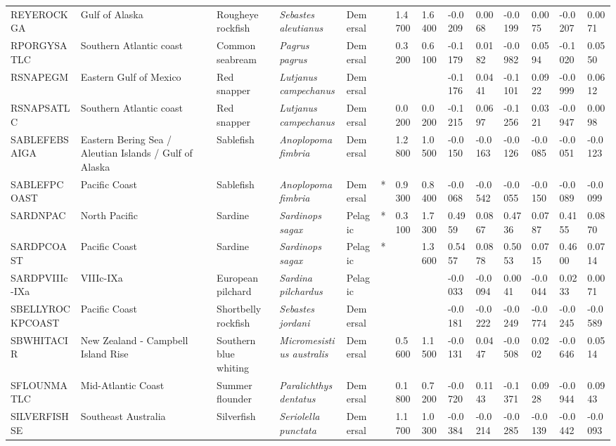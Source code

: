 \begin{longtable}{p{2.6cm}p{1.9cm}p{1.7cm}p{1.6cm}p{1cm}p{0.3cm}p{1cm}p{1cm}p{1cm}p{1.1cm}p{1cm}p{1.1cm}p{1cm}p{1.1cm}}
  REYEROCKGA & Gulf of Alaska & Rougheye rockfish & \textit{Sebastes aleutianus} & Demersal &   & 1.4700 & 1.6400 & -0.0209 & 0.0068 & -0.0199 & 0.0075 & -0.0207 & 0.0071 \\ 
  RPORGYSATLC & Southern Atlantic coast & Common seabream & \textit{Pagrus pagrus} & Demersal &   & 0.3200 & 0.6100 & -0.1179 & 0.0182 & -0.0982 & 0.0594 & -0.1020 & 0.0550 \\ 
  RSNAPEGM & Eastern Gulf of Mexico & Red snapper & \textit{Lutjanus campechanus} & Demersal &  &  &  & -0.1176 & 0.0441 & -0.1101 & 0.0922 & -0.0999 & 0.0612 \\ 
  RSNAPSATLC & Southern Atlantic coast & Red snapper & \textit{Lutjanus campechanus} & Demersal &   & 0.0200 & 0.0200 & -0.1215 & 0.0697 & -0.1256 & 0.0321 & -0.0947 & 0.0098 \\ 
  SABLEFEBSAIGA & Eastern Bering Sea / Aleutian Islands / Gulf of Alaska & Sablefish & \textit{Anoplopoma fimbria} & Demersal &   & 1.2800 & 1.0500 & -0.0150 & -0.0163 & -0.0126 & -0.0085 & -0.0051 & -0.0123 \\ 
  SABLEFPCOAST & Pacific Coast & Sablefish & \textit{Anoplopoma fimbria} & Demersal & * & 0.9300 & 0.8400 & -0.0068 & -0.0542 & -0.0055 & -0.0150 & -0.0089 & -0.0099 \\ 
  SARDNPAC & North Pacific & Sardine & \textit{Sardinops sagax} & Pelagic & * & 0.3100 & 1.7300 & 0.4959 & 0.0867 & 0.4736 & 0.0787 & 0.4155 & 0.0870 \\ 
  SARDPCOAST & Pacific Coast & Sardine & \textit{Sardinops sagax} & Pelagic & * &  & 1.3600 & 0.5457 & 0.0878 & 0.5053 & 0.0715 & 0.4600 & 0.0714 \\ 
  SARDPVIIIc-IXa & VIIIc-IXa & European pilchard & \textit{Sardina pilchardus} & Pelagic &  &  &  & -0.0033 & -0.0094 & 0.0041 & -0.0044 & 0.0233 & 0.0071 \\ 
  SBELLYROCKPCOAST & Pacific Coast & Shortbelly rockfish & \textit{Sebastes jordani} & Demersal &  &  &  & -0.0181 & -0.0222 & -0.0249 & -0.0774 & -0.0245 & -0.0589 \\ 
  SBWHITACIR & New Zealand - Campbell Island Rise & Southern blue whiting & \textit{Micromesistius australis} & Demersal &   & 0.5600 & 1.1500 & -0.0131 & 0.0447 & -0.0508 & 0.0202 & -0.0646 & 0.0514 \\ 
  SFLOUNMATLC & Mid-Atlantic Coast & Summer flounder & \textit{Paralichthys dentatus} & Demersal &   & 0.1800 & 0.7200 & -0.0720 & 0.1143 & -0.1371 & 0.0928 & -0.0944 & 0.0943 \\ 
  SILVERFISHSE & Southeast Australia & Silverfish & \textit{Seriolella punctata} & Demersal &   & 1.1700 & 1.0300 & -0.0384 & -0.0214 & -0.0285 & -0.0139 & -0.0442 & -0.0093 \\ 

\end{longtable}
